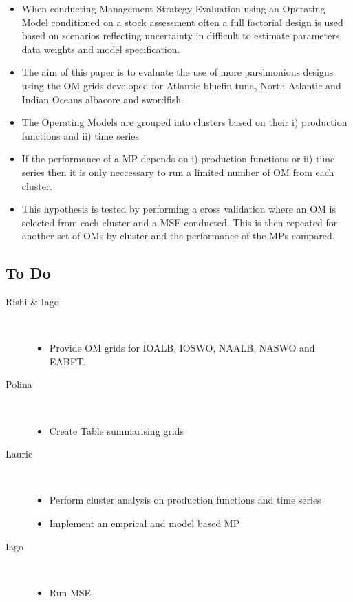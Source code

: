 \documentclass[a4paper,10pt]{article}
\begin{document}
\begin{itemize}
 \item When conducting Management Strategy Evaluation using an Operating Model conditioned on a stock assessment often a full factorial design is used based on scenarios reflecting uncertainty in difficult to estimate parameters, data weights and model specification. 
 \item The aim of this paper is to evaluate the use of more parsimonious designs using the OM grids developed for Atlantic bluefin tuna, North Atlantic and Indian Oceans albacore and swordfish. 
 \item The Operating Models are grouped into clusters based on their i) production functions and ii) time series
 \item If the performance of a MP depends on i) production functions or ii) time series then it is only neccessary to run a limited number of OM from each cluster. 
 \item This hypothesis is tested by performing a cross validation where an OM is selected from each cluster and a MSE conducted. This is then repeated for another set of OMs by cluster and the performance of the MPs compared.    
\end{itemize}

\newpage	
\subsection*{To Do}

\begin{description}
 \item[Rishi \& Iago] ~
 \begin{itemize}
  \item Provide OM grids for IOALB, IOSWO, NAALB, NASWO and EABFT.
 \end{itemize}

 \item[Polina] ~
  \begin{itemize}
  \item  Create Table summarising grids
 \end{itemize}

 \item[Laurie] ~
  \begin{itemize}
  \item Perform cluster analysis on production functions and time series
  \item Implement an emprical and model based MP
 \end{itemize}

 \item[Iago] ~
  \begin{itemize}
  \item  Run MSE
 \end{itemize}
 
\end{description}
\end{document}
